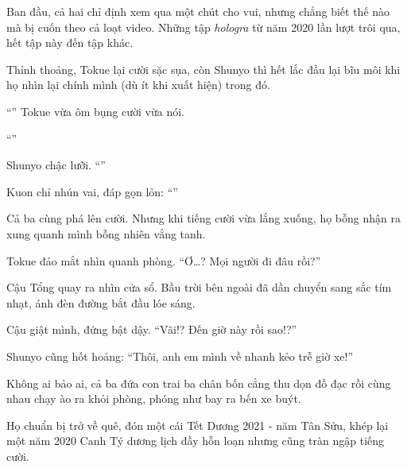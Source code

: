 \documentclass[../main.tex]{subfiles}
\begin{document}
\ct

Ban đầu, cả hai chỉ định xem qua một chút cho vui, nhưng chẳng biết thế nào mà bị cuốn theo cả loạt video. Những tập \textit{hologra} từ năm 2020 lần lượt trôi qua, hết tập này đến tập khác.

Thỉnh thoảng, Tokue lại cười sặc sụa, còn Shunyo thì hết lắc đầu lại bĩu môi khi họ nhìn lại chính mình (dù ít khi xuất hiện) trong đó.

``'' Tokue vừa ôm bụng cười vừa nói.

``''

Shunyo chậc lưỡi. ``''

Kuon chỉ nhún vai, đáp gọn lỏn: ``''

Cả ba cùng phá lên cười. Nhưng khi tiếng cười vừa lắng xuống, họ bỗng nhận ra xung quanh mình bỗng nhiên vắng tanh.

Tokue đảo mắt nhìn quanh phòng. ``Ơ\dots? Mọi người đi đâu rồi?''

Cậu Tổng quay ra nhìn cửa sổ. Bầu trời bên ngoài đã dần chuyển sang sắc tím nhạt, ánh đèn đường bắt đầu lóe sáng.

Cậu giật mình, đứng bật dậy. ``Vãi!? Đến giờ này rồi sao!?''

Shunyo cũng hốt hoảng: ``Thôi, anh em mình về nhanh kẻo trễ giờ xe!''

Không ai bảo ai, cả ba đứa con trai ba chân bốn cẳng thu dọn đồ đạc rồi cùng nhau chạy ào ra khỏi phòng, phóng như bay ra bến xe buýt.

Họ chuẩn bị trở về quê, đón một cái Tết Dương 2021 - năm Tân Sửu, khép lại một năm 2020 Canh Tý dương lịch đầy hỗn loạn nhưng cũng tràn ngập tiếng cười.
\end{document}

